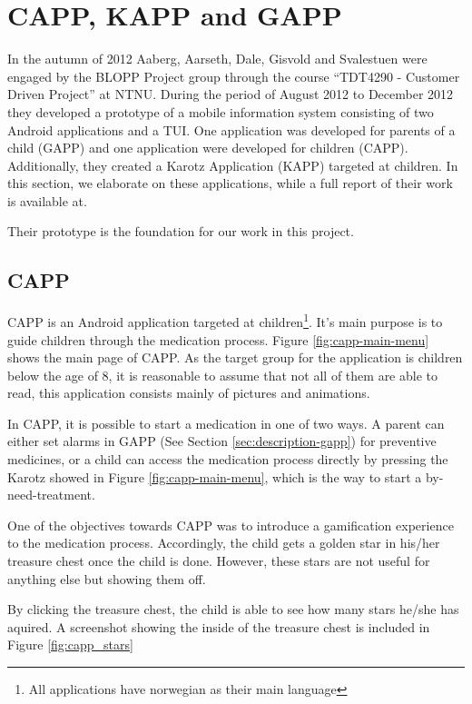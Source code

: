 \section{CAPP, KAPP and GAPP}
\label{sec:cappgappkapp}
In the autumn of 2012 Aaberg, Aarseth, Dale, Gisvold and Svalestuen were engaged by the BLOPP Project group through the course ``TDT4290 - Customer Driven Project'' at NTNU. During the period of August 2012 to December 2012 they developed a prototype of a mobile information system consisting of two Android applications and a TUI. One application was developed for parents of a child (GAPP) and one application were developed for children (CAPP). Additionally, they created a Karotz Application (KAPP) targeted at children. In this section, we elaborate on these applications, while a full report of their work is available at\cite{CustomerDriven}. 

Their prototype is the foundation for our work in this project. 


\subsection{CAPP}
\label{sec:description-capp}
CAPP is an Android application targeted at children\footnote{All applications have norwegian as their main language}. It's main purpose is to guide children through the medication process. Figure \ref{fig:capp-main-menu} shows the main page of CAPP.  
As the target group for the application is children below the age of 8, it is reasonable to assume that not all of them are able to read, this application consists mainly of pictures and animations.


In CAPP, it is possible to start a medication in one of two ways. A parent can either set alarms in GAPP (See Section \ref{sec:description-gapp}) for preventive medicines, or a child can access the medication process directly by pressing the Karotz showed in Figure \ref{fig:capp-main-menu}, which is the way to start a by-need-treatment. 


One of the objectives towards CAPP was to introduce a gamification experience to the medication process. Accordingly, the child gets a golden star in his/her treasure chest once the child is done. However, these stars are not useful for anything else but showing them off.
  

By clicking the treasure chest, the child is able to see how many stars he/she has aquired. A screenshot showing the inside of the treasure chest is included in Figure \ref{fig:capp_stars} 


